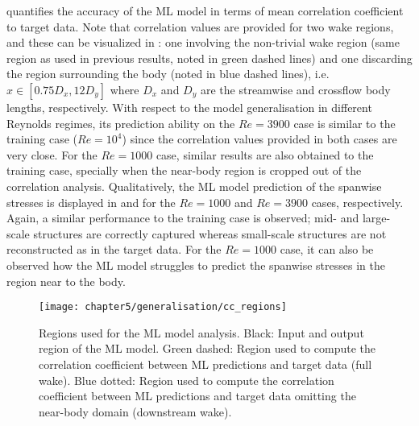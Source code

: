 \documentclass[../main.tex]{subfiles}
\begin{document}
 quantifies the accuracy of the ML model in terms of mean correlation coefficient to target data. 
Note that correlation values are provided for two wake regions, and these can be visualized in :
one involving the non-trivial wake region (same region as used in previous results, noted in green dashed lines) and one discarding the region surrounding the body (noted in blue dashed lines), i.e. $x\in[0.75D_x,12D_y]$ where $D_x$ and $D_y$ are the streamwise and crossflow body lengths, respectively.
With respect to the model generalisation in different Reynolds regimes, its prediction ability on the $Re=3900$ case is similar to the training case ($Re=10^4$) since the correlation values provided in both cases are very close.
For the $Re=1000$ case, similar results are also obtained to the training case, specially when the near-body region is cropped out of the correlation analysis.
Qualitatively, the ML model prediction of the spanwise stresses is displayed in  and  for the $Re=1000$ and $Re=3900$ cases, respectively.
Again, a similar performance to the training case is observed;
mid- and large-scale structures are correctly captured whereas small-scale structures are not reconstructed as in the target data.
For the $Re=1000$ case, it can also be observed how the ML model struggles to predict the spanwise stresses in the region near to the body.

\begin{figure}[t]
\centering
\texttt{[image: chapter5/generalisation/cc\_regions]}
\caption{Regions used for the ML model analysis.
Black: Input and output region of the ML model. 
Green dashed: Region used to compute the correlation coefficient between ML predictions and target data (full wake).
Blue dotted: Region used to compute the correlation coefficient between ML predictions and target data omitting the near-body domain (downstream wake).}
\label{fig:cc_regions}
\end{figure}
\end{document}
